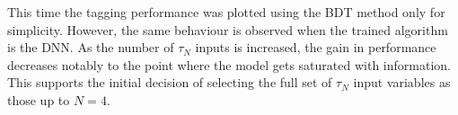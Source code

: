 \documentclass[main]{subfiles} %
\begin{document}
This time the tagging performance was plotted using the BDT method only for simplicity. However, the same behaviour is observed when the trained algorithm is the DNN. As the number of $\tau_N$ inputs is increased, the gain in performance decreases notably to the point where the model gets saturated with information. This supports the initial decision of selecting the full set of $\tau_N$ input variables as those up to $N = 4$.
















\biblio
\end{document}
